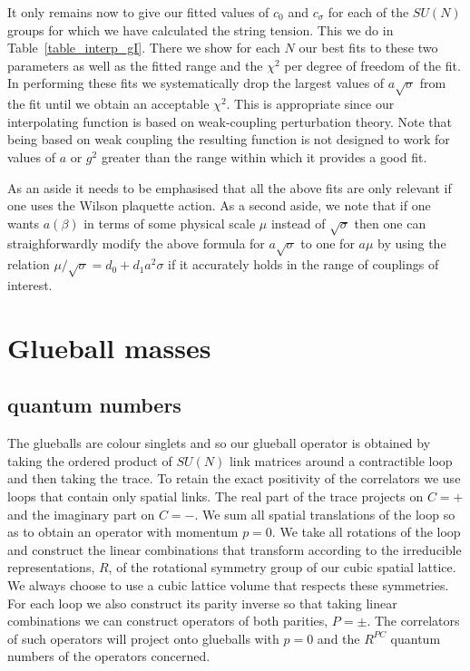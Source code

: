 \documentclass[12pt]{article}
\begin{document}
It only remains now to give our fitted values of $c_0$ and $c_{\sigma}$ for each of the
$SU(N)$ groups for which we have calculated the string tension. This we do in
Table~\ref{table_interp_gI}. There we show for each $N$ our best fits to these
two parameters as well as the fitted range and the $\chi^2$ per degree of freedom
of the fit. In performing these fits we systematically drop the largest values of
$a\surd\sigma$ from the fit until we obtain an acceptable $\chi^2$. This is
appropriate since our interpolating function is based on weak-coupling
perturbation theory. Note that being based on weak coupling the resulting function
is not designed to work for values of $a$ or $g^2$ greater than the range
within which it provides a good fit. 


As an aside it needs to be emphasised that all the above fits are only relevant
if one uses the Wilson plaquette action.
As a second aside, we note that if one wants $a(\beta)$ in terms of some physical
scale $\mu$ instead of $\surd\sigma$ then one can straighforwardly modify the
above formula for $a\surd\sigma$ to one for $a\mu$ by using the relation
$\mu/\surd\sigma = d_0 + d_1 a^2\sigma$ if it accurately holds in the
range of couplings of interest.

%
%
%
\section{Glueball masses}
\label{section_glueballs} 

%
%
\subsection{quantum numbers}
\label{subsection_quantumG}

The glueballs are colour singlets and so our glueball operator is obtained by taking the
ordered product of $SU(N)$ link matrices around a contractible loop and then taking the trace.
To retain the exact positivity of the correlators we use loops that contain only spatial links.
The real part of the trace projects on $C=+$ and the imaginary part on $C=-$.
We sum all spatial translations of the loop so as to obtain an operator with momentum $p=0$.
We take all rotations of the loop and construct the linear combinations that transform
according to the irreducible representations, $R$, of the rotational symmetry group  of our cubic
spatial lattice. We always choose to use a cubic lattice volume that respects these symmetries.
For each loop we also construct its parity inverse so that taking linear combinations
we can construct operators of both parities, $P=\pm$. The correlators of such operators will
project onto glueballs with $p=0$ and the $R^{PC}$ quantum numbers of the operators concerned.
\end{document}

